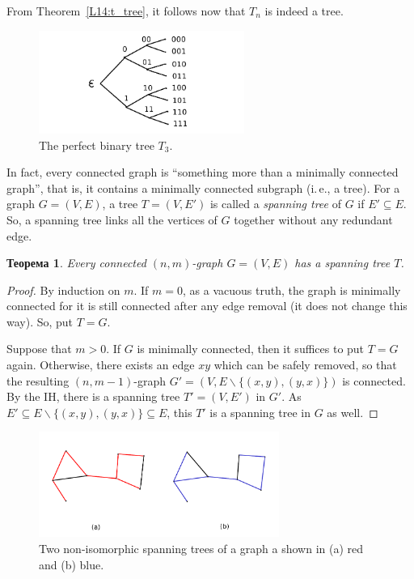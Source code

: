 \documentclass[12pt,notitlepage]{article}
\theoremstyle{plain}
\newtheorem{thm}{Теорема}[section]
\theoremstyle{definition}
\theoremstyle{plain}
\newcommand{\sbs}{\subseteq}
\renewcommand{\setminus}{\smallsetminus}
\newcommand{\1}{\mathbf{1}}
\newcommand{\0}{\mathbf{0}}
\begin{document}
From Theorem~\ref{L14:t_tree}, it follows now that $T_n$ is indeed a tree.

\begin{figure}[h]
	\centering
	\includegraphics*[width=0.6\textwidth]{graph_perf_tree.pdf}
	\caption{The perfect binary tree $T_3$.}
\end{figure}

\medskip

In fact, every connected graph is ``something more than a minimally connected graph'', that is, it contains a minimally connected subgraph (i.\,e., a tree). For a graph $G = (V, E)$, a tree $T = (V, E')$ is called a \emph{spanning tree} of $G$ if $E' \sbs E$. So, a spanning tree links all the vertices of $G$ together without any redundant edge.

\begin{thm}\label{L14:t_spanning}
	Every connected $(n,m)$-graph $G = (V, E)$ has a spanning tree $T$.
\end{thm} 
\begin{proof}
	By induction on $m$. If $m = 0$, as a vacuous truth, the graph is minimally connected for it is still connected after any edge removal (it does not change this way). So, put $T = G$.
	
	Suppose that $m > 0$. If $G$ is minimally connected, then it suffices to put $T = G$ again. Otherwise, there exists an edge $xy$ which can be safely removed, so that the resulting $(n, m - 1)$-graph $G' = (V, E \setminus \{(x,y), (y,x) \})$ is connected. By the IH, there is a spanning tree $T' = (V, E')$ in $G'$. As $E' \sbs E \setminus \{(x,y), (y,x) \} \sbs E$, this $T'$ is a spanning tree in $G$ as well.
\end{proof}

\begin{figure}[h]
	\centering
	\includegraphics*[width=0.7\textwidth]{graph_spanning.pdf}
	\caption{Two non-isomorphic spanning trees of a graph a shown in (a) red and (b) blue.}
\end{figure}
\end{document}

